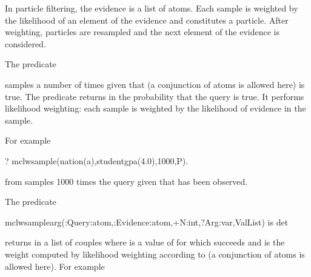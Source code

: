 \documentclass[letterpaper,10pt,english]{sphinxmanual}
\begin{document}
In particle filtering, the evidence is a list of atoms. Each sample is weighted by the likelihood of an element of the evidence and constitutes a particle.
After weighting, particles are resampled and the next element of the evidence is considered.

The predicate

\begin{sphinxVerbatim}[commandchars=\\\{\}]
  
\end{sphinxVerbatim}

samples  a number of  times given that  (a conjunction of atoms is allowed here) is true.
The predicate returns in  the probability that the query is true.
It performs likelihood weighting: each sample is weighted by the likelihood of evidence in the sample.

For example

\begin{sphinxVerbatim}[commandchars=\\\{\}]
?\PYGZhy{} mc\PYGZus{}lw\PYGZus{}sample(nation(a),student\PYGZus{}gpa(4.0),1000,P).
\end{sphinxVerbatim}

from  samples 1000 times the query  given that  has been observed.

The predicate

\begin{sphinxVerbatim}[commandchars=\\\{\}]
mc\PYGZus{}lw\PYGZus{}sample\PYGZus{}arg(:Query:atom,:Evidence:atom,+N:int,?Arg:var,\PYGZhy{}ValList) is det
\end{sphinxVerbatim}

returns in  a list of couples  where  is a value of  for which  succeeds and  is the weight computed by likelihood weighting according to  (a conjunction of atoms is allowed here).
For example
\end{document}
